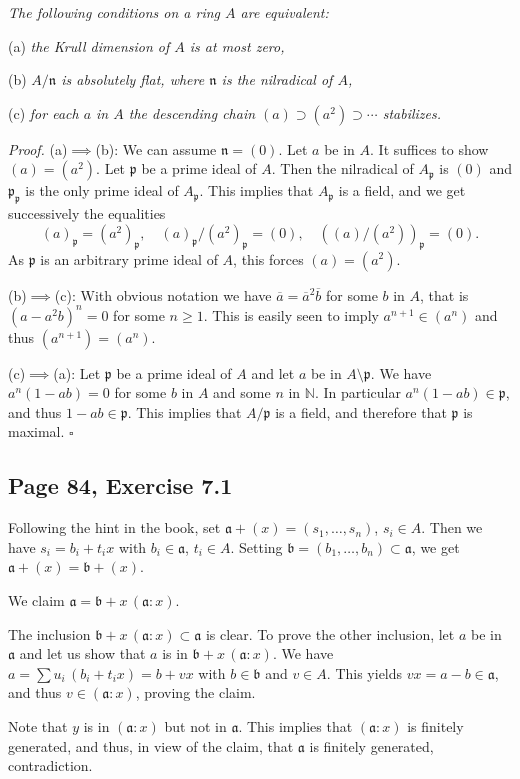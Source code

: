 \documentclass[parskip=half,fontsize=12pt]{scrartcl}%
\newcommand{\mf}{\mathfrak}
\newcommand{\aaa}{\mf a}
\newcommand{\bbb}{\mf b}
\newcommand{\ppp}{\mf p}
\begin{document}
\emph{The following conditions on a ring $A$ are equivalent:}

(a) \emph{the Krull dimension of $A$ is at most zero,}

(b) \emph{$A/\mf n$ is absolutely flat, where $\mf n$ is the nilradical of $A$,}

(c) \emph{for each $a$ in $A$ the descending chain $(a)\supset(a^2)\supset\cdots$ stabilizes.}

\emph{Proof.} (a)$\implies$(b): We can assume $\mf n=(0)$. Let $a$ be in $A$. It suffices to show $(a)=(a^2)$. Let $\ppp$ be a prime ideal of $A$. Then the nilradical of $A_\ppp$ is $(0)$ and $\ppp_\ppp$ is the only prime ideal of $A_\ppp$. This implies that $A_\ppp$ is a field, and we get successively the equalities 
$$
(a)_\ppp=(a^2)_\ppp,\quad(a)_\ppp/(a^2)_\ppp=(0),\quad((a)/(a^2))_\ppp=(0).
$$ 
As $\ppp$ is an arbitrary prime ideal of $A$, this forces $(a)=(a^2)$.

(b)$\implies$(c): With obvious notation we have $\overline a=\overline a^2\overline b$ for some $b$ in $A$, that is $(a-a^2b)^n=0$ for some $n\ge1$. This is easily seen to imply $a^{n+1}\in(a^n)$ and thus $(a^{n+1})=(a^n)$. 

(c)$\implies$(a): Let $\ppp$ be a prime ideal of $A$ and let $a$ be in $A\setminus\ppp$. We have $a^n(1-ab)=0$ for some $b$ in $A$ and some $n$ in $\mathbb N$. In particular $a^n(1-ab)\in\ppp$, and thus $1-ab\in\ppp$. This implies that $A/\ppp$ is a field, and therefore that $\ppp$ is maximal. $\square$

\subsection{Page 84, Exercise 7.1}%

Following the hint in the book, set $\aaa+(x)=(s_1,\dots,s_n)$, $s_i\in A$. Then we have $s_i=b_i+t_ix$ with $b_i\in\aaa$, $t_i\in A$. Setting $\bbb=(b_1,\dots,b_n)\subset\aaa$, we get $\aaa+(x)=\bbb+(x)$. 

We claim $\aaa=\bbb+x\,(\aaa:x)$. 

The inclusion $\bbb+x\,(\aaa:x)\subset\aaa$ is clear. To prove the other inclusion, let $a$ be in $\aaa$ and let us show that $a$ is in $\bbb+x\,(\aaa:x)$. We have $a=\sum u_i\,(b_i+t_ix)=b+vx$ with $b\in\bbb$ and $v\in A$. This yields $vx=a-b\in\aaa$, and thus $v\in(\aaa:x)$, proving the claim.

Note that $y$ is in $(\aaa:x)$ but not in $\aaa$. This implies that $(\aaa:x)$ is finitely generated, and thus, in view of the claim, that $\aaa$ is finitely generated, contradiction.
\end{document}

